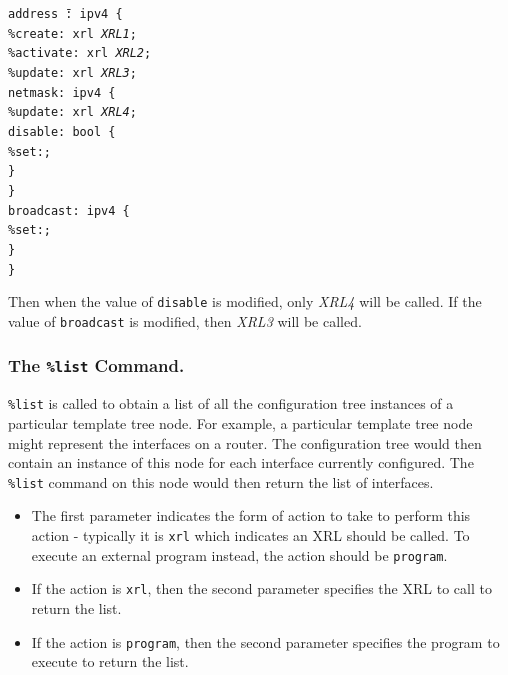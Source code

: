 \documentclass[11pt]{article}
\begin{document}
\begin{tabbing}
\tt addr\=\tt ess \=\tt@: i\=\tt pv4 \{\\
    \>\tt\%create: xrl {\it XRL1};\\
    \>\tt\%activate: xrl {\it XRL2};\\
    \>\tt\%update: xrl {\it XRL3};\\
    \>\tt netmask: ipv4 \{\\
        \>\>\tt\%update: xrl {\it XRL4};\\
        \>\>\tt disable: bool \{\\
             \>\>\>\tt\%set:;\\
        \>\>\tt\}\\
    \>\tt\}\\
    \>\tt broadcast: ipv4 \{\\
        \>\>\tt\%set:;\\
    \>\tt\}\\
\tt\}
\end{tabbing}

Then when the value of {\tt disable} is modified, only
{\it XRL4} will be called. If the value of {\tt broadcast} is modified,
then {\it XRL3} will be called.

\subsubsection{The {\tt \%list} Command.}

{\tt \%list} is called to obtain a list of all the configuration tree
instances of a particular template tree node.  For example, a
particular template tree node might represent the interfaces on a
router.  The configuration tree would then contain an instance of this
node for each interface currently configured.  The {\tt \%list}
command on this node would then return the list of interfaces.

\begin{itemize}
  \item The first parameter indicates the form of action to take to perform
  this action - typically it is {\tt xrl} which indicates an XRL should
  be called.
  To execute an external program instead, the action should be {\tt program}.

  \item If the action is {\tt xrl}, then the second parameter specifies the
  XRL to call to return the list.

  \item If the action is {\tt program}, then the second parameter specifies the
  program to execute to return the list.

\end{itemize}
\end{document}
